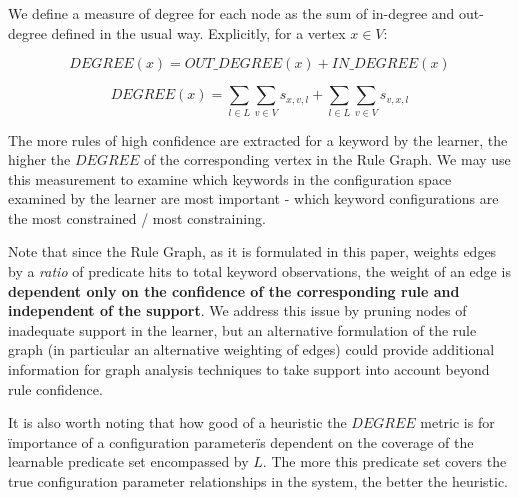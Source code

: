 We define a measure of degree for each node as the sum of in-degree
and out-degree defined in the usual way. Explicitly, for a vertex $x \in V$:

    $$DEGREE(x) = OUT\_DEGREE(x) + IN\_DEGREE(x)$$

    $$DEGREE(x) = \sum_{l \in L} \sum_{v \in V} s_{x, v, l} + \sum_{l \in L} \sum_{v \in V} s_{v, x, l}$$

\iffalse

Note that we will be summing in-degree and out-degree over all
relationships $l$ to determine the total importance of
a keyword $k$ in the configuration space. We are restricted
by the total set of learning modules from which to derive
relationships $l$. If a keyword were highly constrained by some
relationship to other keywords in a way that might not be
measurable by current techniques, the learner (and
consequently the rule graph) will show these keywords as being
unrelated.

\fi


The more rules of high confidence are extracted for a keyword by the learner, 
the higher the $DEGREE$ of the corresponding vertex in the Rule Graph.
We may use this measurement to examine which keywords in the configuration
space examined by the learner are most important - which keyword configurations
are the most constrained / most constraining.

Note that since the Rule Graph, as it is formulated in this paper, weights edges
by a {\it ratio} of predicate hits to total keyword observations, the weight
of an edge is {\bf dependent only on the confidence of the corresponding rule
and independent of the support}. We address this issue by pruning nodes of
inadequate support in the learner, but an alternative formulation of the rule
graph (in particular an alternative weighting of edges)
could provide additional
information for graph analysis techniques to take support into account
beyond rule confidence.


It is also worth noting that how good of a heuristic the $DEGREE$ metric is for
\"importance of a configuration parameter\" is dependent on the coverage
of the learnable predicate set encompassed by $L$. The more this predicate
set covers the true configuration parameter relationships in the system,
the better the heuristic.

